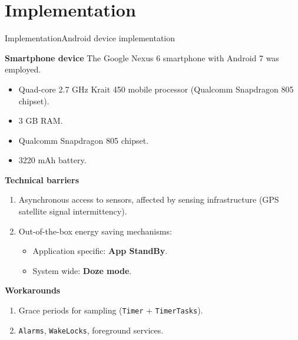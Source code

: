 \section{Implementation}
\begin{frame}{Implementation}{Android device implementation}
\small

\begin{block}{\small \textbf{Smartphone device}}
The Google Nexus 6 smartphone with Android 7 was employed.
\begin{itemize}
  \item Quad-core 2.7 GHz Krait 450 mobile processor (Qualcomm Snapdragon 805 chipset).
  \item 3 GB RAM.
  \item Qualcomm Snapdragon 805 chipset.
  \item 3220 mAh battery.
\end{itemize}
\end{block}

\begin{alertblock}{\small \textbf{Technical barriers}}
\begin{enumerate}
  \item Asynchronous access to sensors, affected by sensing infrastructure (GPS satellite signal intermittency).
  \item Out-of-the-box energy saving mechanisms:
  \begin{itemize}
    \item Application specific: \textbf{App StandBy}.
    \item System wide: \textbf{Doze mode}.
  \end{itemize}
\end{enumerate}
\end{alertblock}

\begin{exampleblock}{\small \textbf{Workarounds}}
\begin{enumerate}
  \item Grace periods for sampling (\texttt{Timer} + \texttt{TimerTasks}).
  \item \texttt{Alarms}, \texttt{WakeLocks}, foreground services.
\end{enumerate}
\end{exampleblock}
\end{frame}

